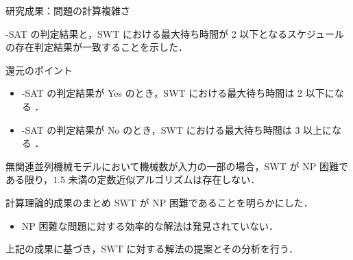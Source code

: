 \documentclass[dvipdfmx]{beamer}
\begin{document}
    \begin{frame}{研究成果：問題の計算複雑さ}

      {-SAT} の判定結果と，SWT における最大待ち時間が \alert{2 以下}となるスケジュールの存在判定結果が一致することを示した．

      \begin{block}{還元のポイント}
        \begin{itemize}
          \item {-SAT} の判定結果が \alert{Yes} のとき，SWT における最大待ち時間は \alert{2 以下}になる ．
          \item {-SAT} の判定結果が \alert{No} のとき，SWT における最大待ち時間は \alert{3 以上}になる ．
        \end{itemize}
      \end{block}
      無関連並列機械モデルにおいて機械数が入力の一部の場合，SWT が NP 困難である限り，$1.5$ 未満の定数近似アルゴリズムは存在しない．
      \begin{alertblock}{計算理論的成果のまとめ}
        SWT が NP 困難であることを明らかにした．
        \begin{itemize}
          \item NP 困難な問題に対する効率的な解法は発見されていない．
        \end{itemize}
      \end{alertblock}
      上記の成果に基づき，SWT に対する解法の提案とその分析を行う．
    \end{frame}
\end{document}
